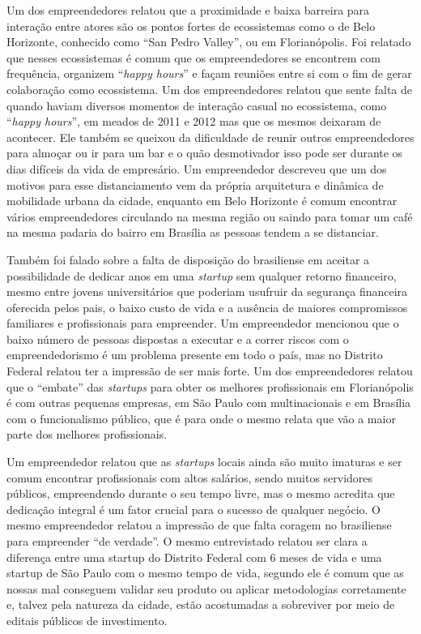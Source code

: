 Um dos empreendedores relatou que a proximidade e baixa barreira para interação entre atores são os pontos fortes de ecossistemas como o de Belo Horizonte, conhecido como ``San Pedro Valley'', ou em Florianópolis. Foi relatado que nesses ecossistemas é comum que os empreendedores se encontrem com frequência, organizem ``\textit{happy hours}'' e façam reuniões entre si com o fim de gerar colaboração como ecossistema. Um dos empreendedores relatou que sente falta de quando haviam diversos momentos de interação casual no ecossistema, como ``\textit{happy hours}'', em meados de 2011 e 2012 mas que os mesmos deixaram de acontecer. Ele também se queixou da dificuldade de reunir outros empreendedores para almoçar ou ir para um bar e o quão desmotivador isso pode ser durante os dias difíceis da vida de empresário. Um empreendedor descreveu que um dos motivos para esse distanciamento vem da própria arquitetura e dinâmica de mobilidade urbana da cidade, enquanto em Belo Horizonte é comum encontrar vários empreendedores circulando na mesma região ou saindo para tomar um café na mesma padaria do bairro em Brasília as pessoas tendem a se distanciar.

Também foi falado sobre a falta de disposição do brasiliense em aceitar a possibilidade de dedicar anos em uma \textit{startup} sem qualquer retorno financeiro, mesmo entre jovens universitários que poderiam usufruir da segurança financeira oferecida pelos pais, o baixo custo de vida e a ausência de maiores compromissos familiares e profissionais para empreender. Um empreendedor mencionou que o baixo número de pessoas dispostas a executar e a correr riscos com o empreendedorismo é um problema presente em todo o país, mas no Distrito Federal relatou ter a impressão de ser mais forte. Um dos empreendedores relatou que o ``embate'' das \textit{startups} para obter os melhores profissionais em Florianópolis é com outras pequenas empresas, em São Paulo com multinacionais e em Brasília com o funcionalismo público, que é para onde o mesmo relata que vão a maior parte dos melhores profissionais.

Um empreendedor relatou que as \textit{startups} locais ainda são muito imaturas e ser comum encontrar profissionais com altos salários, sendo muitos servidores públicos, empreendendo durante o seu tempo livre, mas o mesmo acredita que dedicação integral é um fator crucial para o sucesso de qualquer negócio. O mesmo empreendedor relatou a impressão de que falta coragem no brasiliense para empreender ``de verdade''. O mesmo entrevistado relatou ser clara a diferença entre uma startup do Distrito Federal com 6 meses de vida e uma startup de São Paulo com o mesmo tempo de vida, segundo ele é comum que as nossas mal conseguem validar seu produto ou aplicar metodologias corretamente e, talvez pela natureza da cidade, estão acostumadas a sobreviver por meio de editais públicos de investimento.

